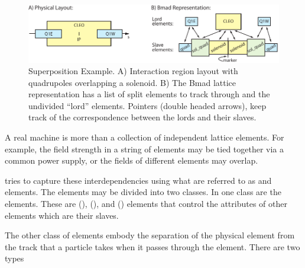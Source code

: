 \begin{figure}[tb]
 \begin{center}
 \includegraphics[width=6.0in]{superimpose-ip.pdf}
 \caption[Superposition example.]
 {
Superposition Example. A) Interaction region layout
with quadrupoles overlapping a solenoid. B) The Bmad lattice
representation has a list of split elements to track through and the
undivided ``lord'' elements. Pointers (double headed arrows), keep
track of the correspondence between the lords and their slaves.
 }
 \label{f:super.ip}
 \end{center}
 \end{figure}


A real machine is more than a collection of independent lattice
elements. For example, the field strength in a string of elements may
be tied together via a common power supply, or the fields of different
elements may overlap.

\bmad tries to capture these interdependencies using what are referred
to as  and  elements. The  elements may be
divided into two classes. In one class are the 
elements.  These are  (), 
(), and  () elements that
control the attributes of other elements which are their slaves.

The other class of  elements embody the separation of the
physical element from the track that a particle takes when it passes
through the element. There are two types


